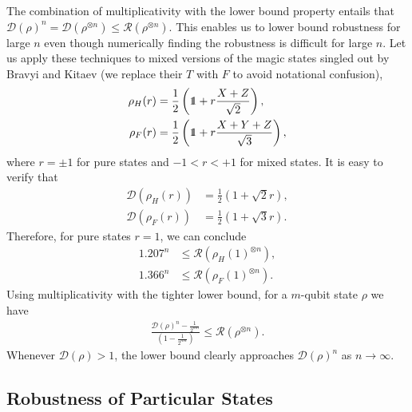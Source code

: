 \documentclass[aps,prl,twocolumn,showpacs,superscriptaddress,groupedaddress,amsmath,amssymb]{revtex4-1}  %
\def\id{\mbox{\small 1} \!\! \mbox{1}}
\begin{document}
The combination of multiplicativity with the lower bound property entails that $\mathcal{D}(\rho)^n = \mathcal{D}(\rho^{\otimes n}) \leq \mathcal{R}(\rho^{\otimes n})$.  This enables us to lower bound robustness for large $n$ even though numerically finding the robustness is difficult for large $n$.  Let us apply these techniques to mixed versions of the magic states singled out by Bravyi and Kitaev \cite{bravyi_universal_2005} (we replace their $T$ with $F$ to avoid notational confusion),
\begin{align}
	\rho_H(r) & = \frac{1}{2}\left( \id + r \frac{X+Z}{\sqrt{2}} \right) ,\\ 
	\rho_F(r) & = \frac{1}{2}\left( \id + r \frac{X+Y+Z}{\sqrt{3}} \right) \label{eqn:FaceState},
\end{align}
where $r=\pm 1$ for pure states and $-1 < r < +1$ for mixed states.  It is easy to verify that 
\begin{align}
    \mathcal{D}(\rho_H(r)) & = \frac{1}{2}(1+\sqrt{2} r) \label{eqn:DofH}  ,\\
    \mathcal{D}(\rho_F(r)) & =\frac{1}{2}(1+\sqrt{3} r)  .
\end{align}
Therefore, for pure states $r=1$, we can conclude
\begin{align}
    1.207^n & \leq \mathcal{R}(\rho_H(1)^{\otimes n}) , \\
    1.366^n & \leq \mathcal{R}(\rho_F(1)^{\otimes n})  .
\end{align}
Using multiplicativity with the tighter lower bound, for a $m$-qubit state $\rho$ we have 
\begin{align}
	\frac{\mathcal{D}(\rho)^n-\frac{1} {2^{nm}} } {\left(1 -  \frac{1}{2^{nm}} \right) }   \leq \mathcal{R}(\rho^{\otimes n}) .
\end{align}
Whenever $\mathcal{D}(\rho)>1$, the lower bound clearly approaches $\mathcal{D}(\rho)^n$ as $n\rightarrow \infty$.





\subsection{Robustness of Particular States}\label{sub:Robustness of Particular States}
\end{document}
